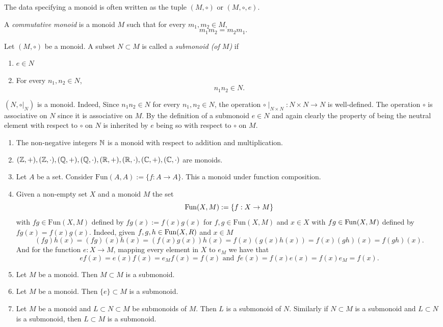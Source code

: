 The data specifying a monoid is often written as the tuple $(M,\circ)$ or $(M,\circ,e)$.
\begin{definition}
    A \textit{commutative monoid} is a monoid $M$ such that for every $m_1,m_2\in M$,
    $$m_1m_2 = m_2m_1.$$
\end{definition}
\begin{definition}
    Let $(M,\circ)$ be a monoid. A subset $N\subset M$ is called a \textit{submonoid (of $M$)} if 
    \begin{enumerate}
        \item $e\in N$
        \item For every $n_1,n_2\in N$,
        $$n_1n_2\in N.$$
    \end{enumerate}
\end{definition}
\begin{remark}\label{ASubmonoidIsAMonoid}
     $(N,\circ|_N)$ is a monoid. Indeed, Since $n_1n_2\in N$ for every $n_1,n_2\in N$, the operation $\circ\mid_{N\times N} : N\times N\rightarrow N$ is well-defined. The operation $\circ$ is associative on $N$ since it is associative on $M$. By the definition of a submonoid $e\in N$ and again clearly the property of being the neutral element with respect to $\circ$ on $N$ is inherited by $e$ being so with respect to $\circ$ on $M$.  
\end{remark}
\begin{example}\label{SubMonoidsExample}
    \begin{enumerate}
        \item The non-negative integers $\mathbb{N}$ is a monoid with respect to addition and multiplication. 
        \item $(\mathbb{Z},+),(\mathbb{Z},\cdot),(\mathbb{Q},+),(\mathbb{Q},\cdot),(\mathbb{R},+),(\mathbb{R},\cdot),(\mathbb{C},+),(\mathbb{C},\cdot)$ are monoids.
        \item Let $A$ be a set. Consider $\text{Fun}(A,A) := \{f:A\rightarrow A\}$. This a monoid under function composition.
        \item Given a non-empty set $X$ and a monoid $M$ the set $$\mathrm{Fun}(X,M):=\left\{ f: X\rightarrow M\right\}$$
        with $fg\in \text{Fun}(X,M)$ defined by $fg(x) := f(x)g(x)$ for $f,g\in \text{Fun}(X,M)$ and $x\in X$
        with $fg\in\mathrm{Fun}(X,M) $ defined by $fg(x) = f(x)g(x)$. Indeed, given $f,g,h\in \mathrm{Fun}(X,R)$ and $x\in M$
        $$(fg)h(x)=(fg)(x)h(x)=(f(x)g(x))h(x)= f(x)(g(x)h(x))=f(x)(gh)(x)=f(gh)(x).$$
        And for the function $e : X \rightarrow M$, mapping every element in $X$ to $e_M$ we have that 
        $$ef(x) = e(x)f(x) = e_Mf(x) = f(x) \text{ and } fe(x)=f(x)e(x)=f(x)e_M = f(x).$$
        \item Let $M$ be a monoid. Then $M\subset M$ is a submonoid. 
        \item Let $M$ be a monoid. Then $\{e\}\subset M$ is a submonoid.
        \item Let $M$ be a monoid and $L\subset N\subset M$ be submonoids of $M$. Then $L$ is a submonoid of $N$. Similarly if $N\subset M$ is a submonoid and $L\subset N$ is a submonoid, then $L\subset M$ is a submonoid. 
        
    \end{enumerate}
\end{example}
